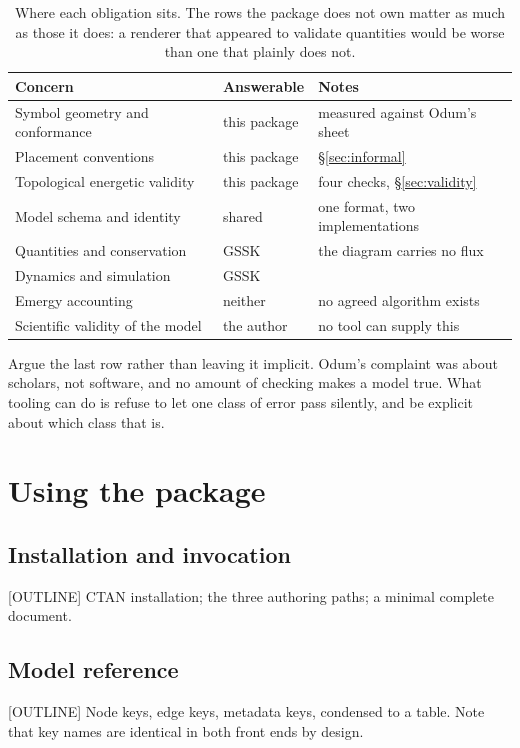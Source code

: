 \begin{table}[htbp]
\centering
\begin{tabular}{lll}
\toprule
Concern & Answerable & Notes \\
\midrule
Symbol geometry and conformance  & this package & measured against Odum's sheet \\
Placement conventions            & this package & \S\ref{sec:informal} \\
Topological energetic validity   & this package & four checks, \S\ref{sec:validity} \\
Model schema and identity        & shared       & one format, two implementations \\
Quantities and conservation      & GSSK         & the diagram carries no flux \\
Dynamics and simulation          & GSSK         & \\
Emergy accounting                & neither      & no agreed algorithm exists \\
Scientific validity of the model & the author   & no tool can supply this \\
\bottomrule
\end{tabular}
\caption{Where each obligation sits. The rows the package does not own matter as
much as those it does: a renderer that appeared to validate quantities would be
worse than one that plainly does not.}
\label{tab:raci}
\end{table}

Argue the last row rather than leaving it implicit. Odum's complaint was about
scholars, not software, and no amount of checking makes a model true. What
tooling can do is refuse to let one class of error pass silently, and be
explicit about which class that is.

\section{Using the package}
\label{sec:usage}

\subsection{Installation and invocation}
[OUTLINE] CTAN installation; the three authoring paths; a minimal complete
document.

\subsection{Model reference}
[OUTLINE] Node keys, edge keys, metadata keys, condensed to a table. Note that
key names are identical in both front ends by design.

